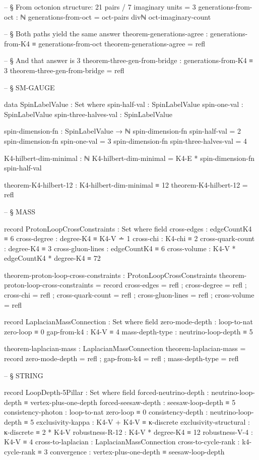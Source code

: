 \documentclass[11pt,a4paper]{book}
\begin{document}
\begin{code}
-- § From octonion structure: 21 pairs / 7 imaginary units = 3
generations-from-oct : ℕ
generations-from-oct = oct-pairs divℕ oct-imaginary-count

-- § Both paths yield the same answer
theorem-generations-agree : generations-from-K4 ≡ generations-from-oct
theorem-generations-agree = refl

-- § And that answer is 3
theorem-three-gen-from-bridge : generations-from-K4 ≡ 3
theorem-three-gen-from-bridge = refl


-- § SM-GAUGE

data SpinLabelValue : Set where
  spin-half-val : SpinLabelValue
  spin-one-val : SpinLabelValue
  spin-three-halves-val : SpinLabelValue

spin-dimension-fn : SpinLabelValue → ℕ
spin-dimension-fn spin-half-val = 2
spin-dimension-fn spin-one-val = 3
spin-dimension-fn spin-three-halves-val = 4

K4-hilbert-dim-minimal : ℕ
K4-hilbert-dim-minimal = K4-E * spin-dimension-fn spin-half-val

theorem-K4-hilbert-12 : K4-hilbert-dim-minimal ≡ 12
theorem-K4-hilbert-12 = refl


-- § MASS

record ProtonLoopCrossConstraints : Set where
  field
    cross-edges : edgeCountK4 ≡ 6
    cross-degree : degree-K4 ≡ K4-V ∸ 1
    cross-chi : K4-chi ≡ 2
    cross-quark-count : degree-K4 ≡ 3
    cross-gluon-lines : edgeCountK4 ≡ 6
    cross-volume : K4-V * edgeCountK4 * degree-K4 ≡ 72

theorem-proton-loop-cross-constraints : ProtonLoopCrossConstraints
theorem-proton-loop-cross-constraints = record
  { cross-edges = refl
  ; cross-degree = refl
  ; cross-chi = refl
  ; cross-quark-count = refl
  ; cross-gluon-lines = refl
  ; cross-volume = refl
  }

record LaplacianMassConnection : Set where
  field
    zero-mode-depth : loop-to-nat zero-loop ≡ 0
    gap-from-k4 : K4-V ≡ 4
    mass-depth-type : neutrino-loop-depth ≡ 5

theorem-laplacian-mass : LaplacianMassConnection
theorem-laplacian-mass = record
  { zero-mode-depth = refl
  ; gap-from-k4 = refl
  ; mass-depth-type = refl
  }


-- § STRING

record LoopDepth-5Pillar : Set where
  field
    forced-neutrino-depth : neutrino-loop-depth ≡ vertex-plus-one-depth
    forced-seesaw-depth   : seesaw-loop-depth ≡ 5
    consistency-photon    : loop-to-nat zero-loop ≡ 0
    consistency-depth     : neutrino-loop-depth ≡ 5
    exclusivity-kappa      : K4-V + K4-V ≡ κ-discrete
    exclusivity-structural : κ-discrete ≡ 2 * K4-V
    robustness-R-12       : K4-V * degree-K4 ≡ 12
    robustness-V-4        : K4-V ≡ 4
    cross-to-laplacian    : LaplacianMassConnection
    cross-to-cycle-rank   : k4-cycle-rank ≡ 3
    convergence           : vertex-plus-one-depth ≡ seesaw-loop-depth


\end{code}
\end{document}
